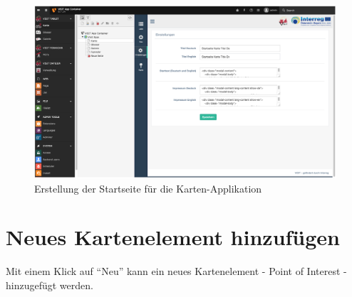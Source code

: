 \begin{figure}[ht!]
\centering
\includegraphics[width=12cm]{Figures/paula/befuellte_startseite_karte.png}
\caption{Erstellung der Startseite für die Karten-Applikation}
\label{img:befuellte_startseite_karte}
\end{figure}

\section{Neues Kartenelement hinzufügen}

Mit einem Klick auf “Neu” kann ein neues Kartenelement - Point of Interest - hinzugefügt werden.



\cite{anno4j1}
